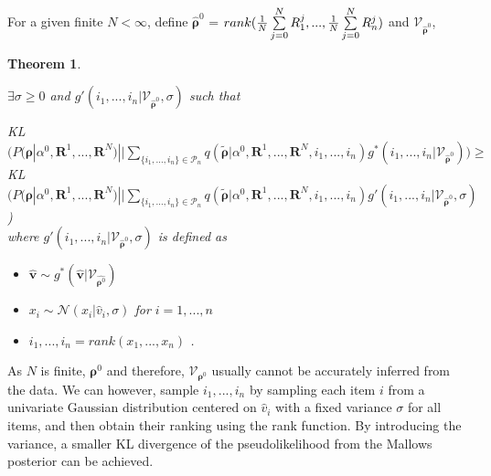 \documentclass[11pt, oneside]{article}   	%
\newtheorem{theorem}{Theorem}[subsection]
\begin{document}
\subsection{ }
For a given finite $N < \infty$, define $\hat{\bm{\rho}}^0$ = $rank({1\over N}\sum\limits_{j=0}^{N}R_1^j, ..., {1\over N}\sum\limits_{j=0}^{N}R_n^j)$ and  $\mathcal{V}_{\hat{\bm{\rho}}^0}$, 

\begin{theorem} \label{theorem:gaussiannoise}

$\exists\sigma \geq 0$ and $g'(i_1, ..., i_n|\mathcal{V}_{\hat{\bm{\rho}}^0}, \sigma)$ such that 

 KL $\Big(P(\bm{\rho}|\alpha^0, \bm{R}^1, ...,\bm{R}^N ) || \sum\limits_{\{i_1,..., i_n\} \in \mathcal{P}_n} q (\tilde{\bm{\rho}}|\alpha^0, \bm{R}^1,..., \bm{R}^N, i_1,...,i_n) g^{*}(i_1,...,i_n|\mathcal{V}_{\hat{\bm{\rho}}^0})\Big)\geq $\\
 KL $\Big(P(\bm{\rho}|\alpha^0, \bm{R}^1, ...,\bm{R}^N ) || \sum\limits_{\{i_1,..., i_n\} \in \mathcal{P}_n} q (\tilde{\bm{\rho}}|\alpha^0, \bm{R}^1,..., \bm{R}^N, i_1,...,i_n) g'(i_1,...,i_n|\mathcal{V}_{\hat{\bm{\rho}}^0}, \sigma)$\Big)\\

 where 
 $g'(i_1, ..., i_n|\mathcal{V}_{\hat{\bm{\rho}}^0}, \sigma) $ is defined as 
 \begin{itemize}
 	\item {$\hat{\bm{v}} \sim g^* (\hat{\bm{v}}|\mathcal{V}_{\hat{\bm{\rho}^{0}}})$}
  	\item {$x_i\sim \mathcal{N}(x_i|\hat{v}_i, \sigma)$} for $i = 1,...,n $
 	\item {$i_1, ..., i_n = rank(x_1, ..., x_n)$ }. 
 \end{itemize}
 	
\end{theorem} 
As $N$ is finite, $\bm{\rho}^0$ and therefore, $\mathcal{V}_{\bm{\rho}^0}$ usually cannot be accurately inferred from the data. We can however, sample $i_1, ..., i_n$ by sampling each item $i$ from a univariate Gaussian distribution centered on $\hat{v}_i$ with a fixed variance $\sigma$ for all items, and then obtain their ranking using the rank function. By introducing the variance, a smaller KL divergence of the pseudolikelihood from the Mallows posterior can be achieved.
 
\end{document}
